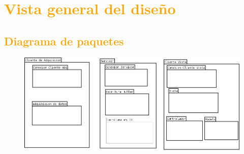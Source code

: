 



\newpage
\section{\textcolor{orange}{Vista general del diseño}}
\subsection{\textcolor{orange}{Diagrama de paquetes}}
\begin{figure}[h!]
 \begin{center}
  \includegraphics[width=1\textwidth,keepaspectratio=true]{img/diagrama_paquetes.png}
  \label{fig:esquema}
 \end{center}
\end{figure}


